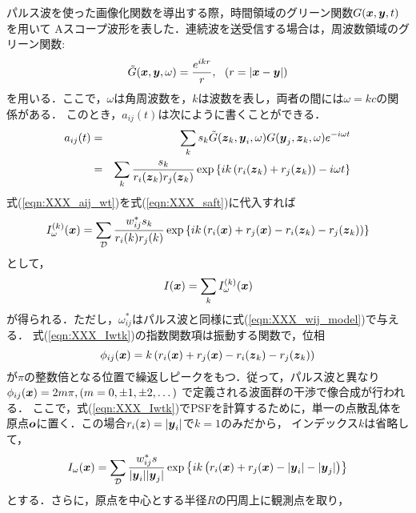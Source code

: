 パルス波を使った画像化関数を導出する際，時間領域のグリーン関数$G(\mbox{\boldmath $x$},\mbox{\boldmath $y$},t)$を用いて
Aスコープ波形を表した．連続波を送受信する場合は，周波数領域のグリーン関数:
\begin{equation}
	\tilde G(\mbox{\boldmath $x$},\mbox{\boldmath $y$},\omega)
	=
	\frac{e^{ikr}}{r}, \ \ (r=\left| \mbox{\boldmath $x$}-\mbox{\boldmath $y$} \right|)
	\label{eqn:}
\end{equation}
を用いる．ここで，$\omega$は角周波数を，$k$は波数を表し，両者の間には$\omega=kc$の関係がある．
このとき，$a_{ij}(t)$は次にように書くことができる．
\begin{eqnarray}
	a_{ij}(t)
	&=&
	\sum_k 
	s_k \tilde G(\mbox{\boldmath $z$}_k,\mbox{\boldmath $y$}_i,\omega)G(\mbox{\boldmath $y$}_j,\mbox{\boldmath $z$}_k,\omega)e^{-i\omega t} \\
	&=&
	\sum_k \frac{s_k}{r_i(\mbox{\boldmath $z$}_k)r_j(\mbox{\boldmath $z$}_k)}
	\exp\left\{
		ik\left( 
			r_i(\mbox{\boldmath $z$}_k)+r_j(\mbox{\boldmath $z$}_k)
		\right)
		-i\omega t
	\right\}
	\label{eqn:XXX_aij_wt}
\end{eqnarray}
式(\ref{eqn:XXX_aij_wt})を式(\ref{eqn:XXX_saft})に代入すれば
\begin{equation}
	I_\omega^{(k)}(\mbox{\boldmath $x$})
		=
	\sum_{\cal D} 
	\frac{w_{ij}^*s_k}{r_i(k)r_j(k)} 
	\exp \left\{ 
	ik
	\left(
		r_i(\mbox{\boldmath $x$})+r_j(\mbox{\boldmath $x$})-r_i(\mbox{\boldmath $z$}_k)-r_j(\mbox{\boldmath $z$}_k)
	\right)
	\right\} 
	\label{eqn:XXX_Iwtk}
\end{equation}
として，
\begin{equation}
	I(\mbox{\boldmath $x$})
		=
		\sum_{k}
	I_\omega^{(k)}(\mbox{\boldmath $x$})
	\label{eqn:XXX_Iwt}
\end{equation}
が得られる．ただし，$\omega_{ij}^*$はパルス波と同様に式(\ref{eqn:XXX_wij_model})で与える．
式(\ref{eqn:XXX_Iwtk})の指数関数項は振動する関数で，位相
\begin{equation}
	\phi_{ij}(\mbox{\boldmath $x$})=k 
	\left(
		r_i(\mbox{\boldmath $x$})+r_j(\mbox{\boldmath $x$})-r_i(\mbox{\boldmath $z$}_k)-r_j(\mbox{\boldmath $z$}_k)
	\right)
	\label{eqn:}
\end{equation}
が$\pi$の整数倍となる位置で繰返しピークをもつ．従って，パルス波と異なり
$\phi_{ij}(\mbox{\boldmath $x$})=2m\pi, (m=0,\pm 1, \pm 2,\dots)$
で定義される波面群の干渉で像合成が行われる．
ここで，式(\ref{eqn:XXX_Iwtk})でPSFを計算するために，単一の点散乱体を
原点$\mbox{\boldmath $o$}$に置く．この場合$r_i(\mbox{\boldmath $z$})=|\mbox{\boldmath $y$}_i|$で$k=1$のみだから，
インデックス$k$は省略して，
\begin{equation}
	I_\omega(\mbox{\boldmath $x$})
		=
	\sum_{\cal D} 
	\frac{w_{ij}^*s}{|\mbox{\boldmath $y$}_i||\mbox{\boldmath $y$}_j|} 
	\exp \left\{ 
	ik
	\left(
		r_i(\mbox{\boldmath $x$})+r_j(\mbox{\boldmath $x$})-|\mbox{\boldmath $y$}_i|-|\mbox{\boldmath $y$}_j|
	\right)
	\right\}
	\label{eqn:XXX_PSFw}
\end{equation}
とする．さらに，原点を中心とする半径$R$の円周上に観測点を取り，
